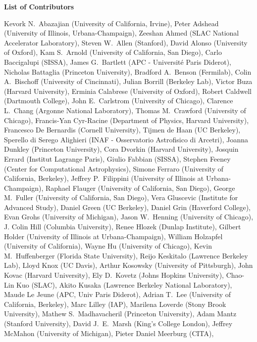\begin{center}
\textbf{List of Contributors}
\end{center}
Kevork N.~Abazajian (University of California, Irvine),
Peter Adshead (University of Illinois, Urbana-Champaign),
Zeeshan Ahmed (SLAC National Accelerator Laboratory),
Steven W.~Allen (Stanford),
David Alonso (University of Oxford),
Kam S.~Arnold (University of California, San Diego),
Carlo Baccigalupi (SISSA),
James G.~Bartlett (APC - Université Paris Diderot),
Nicholas Battaglia (Princeton University),
Bradford A.~Benson (Fermilab),
Colin A.~Bischoff (University of Cincinnati),
Julian Borrill (Berkeley Lab),
Victor Buza (Harvard University),
Erminia Calabrese (University of Oxford),
Robert Caldwell (Dartmouth College),
John E.~Carlstrom (University of Chicago),
Clarence L.~Chang (Argonne National Laboratory),
Thomas M.~Crawford (University of Chicago),
Francis-Yan Cyr-Racine (Department of Physics, Harvard University),
Francesco De Bernardis (Cornell University),
Tijmen de Haan (UC Berkeley),
Sperello di Serego Alighieri (INAF - Osservatorio Astrofisico di Arcetri),
Joanna Dunkley (Princeton University),
Cora Dvorkin (Harvard University),
Josquin Errard (Institut Lagrange Paris),
Giulio Fabbian (SISSA),
Stephen Feeney (Center for Computational Astrophysics),
Simone Ferraro (University of California, Berkeley),
Jeffrey P.~Filippini (University of Illinois at Urbana-Champaign),
Raphael Flauger (University of California, San Diego),
George M.~Fuller (University of California, San Diego),
Vera Gluscevic (Institute for Advanced Study),
Daniel Green (UC Berkeley),
Daniel Grin (Haverford College),
Evan Grohs (University of Michigan),
Jason W.~Henning (University of Chicago),
J. Colin Hill (Columbia University),
Renee Hlozek (Dunlap Institute),
Gilbert Holder (University of Illinois at Urbana-Champaign),
William Holzapfel (University of California),
Wayne Hu (University of Chicago),
Kevin M.~Huffenberger (Florida State University),
Reijo Keskitalo (Lawrence Berkeley Lab),
Lloyd Knox (UC Davis),
Arthur Kosowsky (University of Pittsburgh),
John Kovac (Harvard University),
Ely D.~Kovetz (Johns Hopkins University),
Chao-Lin Kuo (SLAC),
Akito Kusaka (Lawrence Berkeley National Laboratory),
Maude Le Jeune (APC, Univ Paris Diderot),
Adrian T.~Lee (University of California, Berkeley),
Marc Lilley (IAP),
Marilena Loverde (Stony Brook University),
Mathew S.~Madhavacheril (Princeton University),
Adam Mantz (Stanford University),
David J.~E.~Marsh (King's College London),
Jeffrey McMahon (University of Michigan),
Pieter Daniel Meerburg (CITA),
